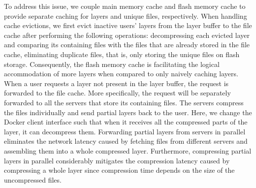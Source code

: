 To address this issue, we couple main memory cache and flash memory cache to provide separate caching for layers and unique files, respectively.
When handling cache evictions, we first evict inactive users' layers from the layer buffer to the file cache after performing 
the following operations: decompressing each evicted layer and comparing its containing files with the files that are already 
stored in the file cache, eliminating duplicate files, that is, only storing the unique files on flash storage.
Consequently, the flash memory cache is facilitating the logical accommodation of more layers when compared to only naively caching layers.
When a user requests a layer not present in the layer buffer, the request is forwarded to the file cache. 
More specifically, the request will be separately forwarded to all the servers that store its containing files. 
The servers compress the files individually and send partial layers back to the user. 
Here, we change the Docker client interface such that when it receives all the compressed parts of the layer, it can decompress them. 
Forwarding partial layers from servers in parallel eliminates the network latency caused by fetching files from different servers and assembling them into a whole compressed layer.
Furthermore, compressing partial layers in parallel considerably mitigates the compression latency caused by compressing a whole layer since compression time depends on the size of the uncompressed files.

    





 
